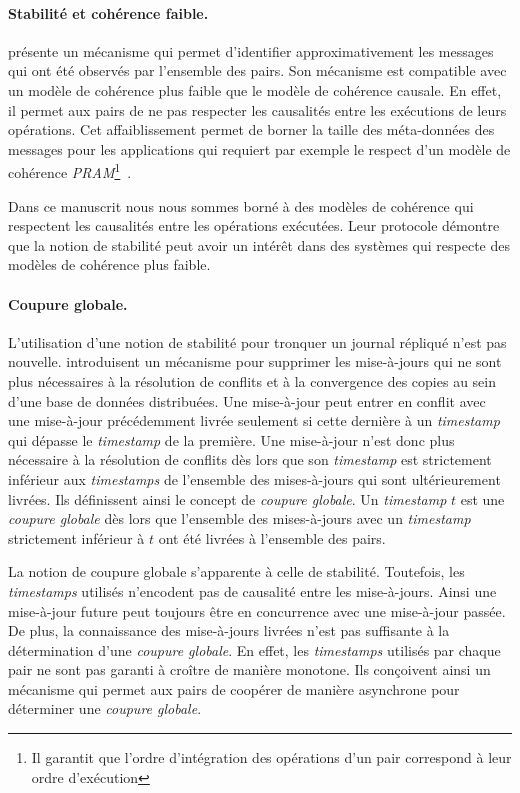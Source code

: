 \paragraph{Stabilité et cohérence faible.} \textcite{golding_1992_ackvector} présente un mécanisme qui permet d'identifier approximativement les messages qui ont été observés par l'ensemble des pairs.
Son mécanisme est compatible avec un modèle de cohérence plus faible que le modèle de cohérence causale.
En effet, il permet aux pairs de ne pas respecter les causalités entre les exécutions de leurs opérations.
Cet affaiblissement permet de borner la taille des méta-données des messages pour les applications qui requiert par exemple le respect d'un modèle de cohérence \emph{PRAM}\footnote{Il garantit que l'ordre d'intégration des opérations d'un pair correspond à leur ordre d'exécution}~\autocite{viotti_consistency_2016}.

Dans ce manuscrit nous nous sommes borné à des modèles de cohérence qui respectent les causalités entre les opérations exécutées.
Leur protocole démontre que la notion de stabilité peut avoir un intérêt dans des systèmes qui respecte des modèles de cohérence plus faible.

\paragraph{Coupure globale.} L'utilisation d'une notion de stabilité pour tronquer un journal répliqué n'est pas nouvelle.
\textcite{sarin_1987_discarding} introduisent un mécanisme pour supprimer les mise-à-jours qui ne sont plus nécessaires à la résolution de conflits et à la convergence des copies au sein d'une base de données distribuées.
Une mise-à-jour peut entrer en conflit avec une mise-à-jour précédemment livrée seulement si cette dernière à un \emph{timestamp} qui dépasse le \emph{timestamp} de la première.
Une mise-à-jour n'est donc plus nécessaire à la résolution de conflits dès lors que son \emph{timestamp} est strictement inférieur aux \emph{timestamps} de l'ensemble des mises-à-jours
qui sont ultérieurement livrées.
Ils définissent ainsi le concept de \emph{coupure globale}.
Un \emph{timestamp} $t$ est une \emph{coupure globale} dès lors que l'ensemble des mises-à-jours avec un \emph{timestamp} strictement inférieur à $t$ ont été livrées à l'ensemble des pairs.

La notion de coupure globale s'apparente à celle de stabilité.
Toutefois, les \emph{timestamps} utilisés n'encodent pas de causalité entre les mise-à-jours.
Ainsi une mise-à-jour future peut toujours être en concurrence avec une mise-à-jour passée.
De plus, la connaissance des mise-à-jours livrées n'est pas suffisante à la détermination d'une \emph{coupure globale}.
En effet, les \emph{timestamps} utilisés par chaque pair ne sont pas garanti à croître de manière monotone.
Ils conçoivent ainsi un mécanisme qui permet aux pairs de coopérer de manière asynchrone pour déterminer une \emph{coupure globale}.


